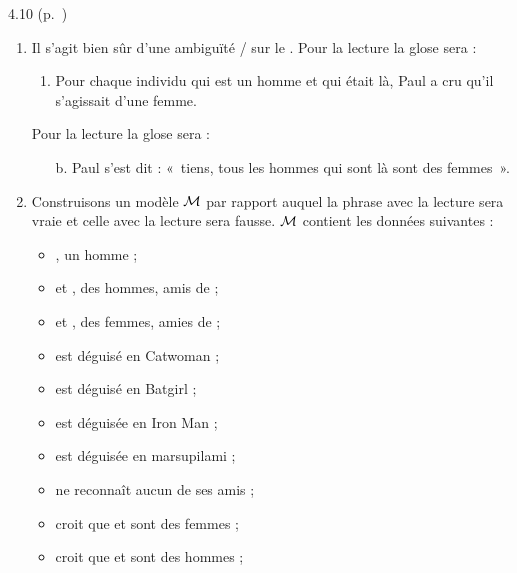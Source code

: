 \begin{Solution}{4.{10}}
(p.~\pageref{exo:homfem})\label{crg:homfem}
\begin{enumerate}
\item Il s'agit bien sûr d'une ambiguïté / sur le {\GN} .
Pour la lecture  la glose sera :
  \begin{enumerate}
  \item Pour chaque individu qui est un homme et qui était là, Paul a cru qu'il s'agissait d'une femme.
  \end{enumerate}
Pour la lecture  la glose sera :
  \begin{enumerate}
  \item[b.] Paul s'est dit : «~tiens, tous les hommes qui sont là sont des femmes~».
  \end{enumerate}
\item Construisons un modèle $\mathcal{M}$ par rapport auquel la phrase avec la lecture  sera vraie et celle avec la lecture  sera fausse.  $\mathcal{M}$ contient les données suivantes :
\begin{itemize}
\item {}, un homme ;
\item {} et , des hommes, amis de  ;
\item {} et , des femmes, amies de  ;
\item {} est déguisé en Catwoman ;
\item {} est déguisé en Batgirl ;
\item {} est déguisée en Iron Man ;
\item {} est déguisée en marsupilami ;
\item {} ne reconnaît aucun de ses amis ;
\item {} croit que  et  sont des femmes ;
\item {} croit que  et  sont des hommes ;
\end{itemize}


\end{enumerate}
\end{Solution}
